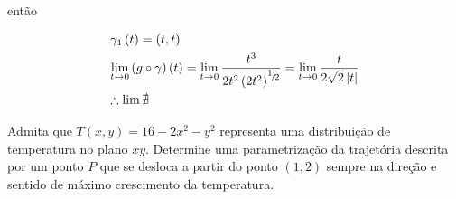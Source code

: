 \documentclass{book}
\begin{document}
\begin{sol}
ent\~ao

\[
\begin{gathered}
  \gamma _1 \left( t \right) = \left( {t,t} \right) \hfill \\
  \mathop {\lim }\limits_{t \to 0} \left( {g \circ \gamma } \right)\left( t \right) = \mathop {\lim }\limits_{t \to 0} \frac{{t^3 }}
{{2t^2 \left( {2t^2 } \right)^{{\raise0.5ex\hbox{$\scriptstyle 1$}
\kern-0.1em/\kern-0.15em
\lower0.25ex\hbox{$\scriptstyle 2$}}} }} = \mathop {\lim }\limits_{t \to 0} \frac{t}
{{2\sqrt 2 \left| t \right|}} \hfill \\
  \therefore \lim \nexists  \hfill \\
\end{gathered}
\]

\end{sol}

  \item Admita que $T(x,y) = 16-2x^2-y^2$ representa uma distribui\c{c}\~ao de temperatura no plano $xy$. Determine uma parametriza\c{c}\~ao da trajet\'oria descrita por um ponto $P$ que se desloca a partir do ponto $(1,2)$ sempre na dire\c{c}\~ao e sentido de m\'aximo crescimento da temperatura.
\end{document}
